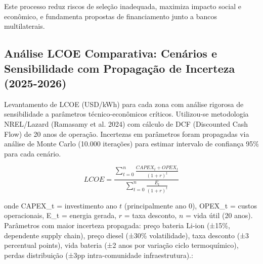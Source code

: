 \documentclass[12pt, a4paper]{article}
\begin{document}
{{{{{{{{{{{Este processo reduz riscos de seleção inadequada, maximiza impacto social e econômico, e fundamenta propostas de financiamento junto a bancos multilaterais.



\subsection{Análise LCOE Comparativa: Cenários e Sensibilidade com Propagação de Incerteza (2025-2026)}

Levantamento de LCOE (USD/kWh) para cada zona com análise rigorosa de sensibilidade a parâmetros técnico-econômicos críticos. Utilizou-se metodologia NREL/Lazard (Ramasamy et al. 2024) com cálculo de DCF (Discounted Cash Flow) de 20 anos de operação. Incertezas em parâmetros foram propagadas via análise de Monte Carlo (10.000 iterações) para estimar intervalo de confiança 95\% para cada cenário.

\begin{equation}
LCOE = \frac{\sum_{t=0}^{n} \frac{CAPEX_t + OPEX_t}{(1+r)^t}}{\sum_{t=0}^{n} \frac{E_t}{(1+r)^t}}
\end{equation}

onde CAPEX_t = investimento ano $t$ (principalmente ano 0), OPEX_t = custos operacionais, E_t = energia gerada, $r$ = taxa desconto, $n$ = vida útil (20 anos). Parâmetros com maior incerteza propagada: preço bateria Li-ion (±15\%, dependente supply chain), preço diesel (±30\% volatilidade), taxa desconto (±3 percentual points), vida bateria (±2 anos por variação ciclo termoquímico), perdas distribuição (±3pp intra-comunidade infraestrutura).:

}}}}}}}}}}}
\end{document}
